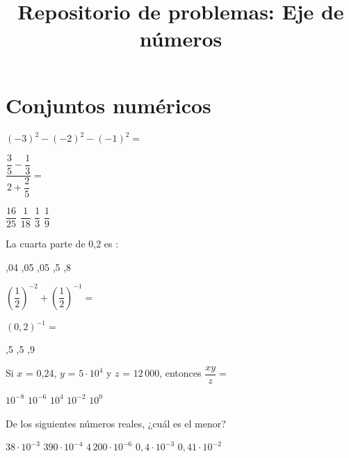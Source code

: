 \documentclass[pagina vacia]{srs}
\title{Repositorio de problemas: Eje de números}
\begin{document}
\maketitle
\section{Conjuntos numéricos}



\begin{preguntas}[after-item-skip=1cm]
\pregunta \( \left(-3\right)^2 - \left(-2\right)^2 - \left(-1\right)^2 = \)
\begin{vertical}
\end{vertical}

\pregunta \( \dfrac{\dfrac{3}{5} - \dfrac{1}{3}}{2 + \dfrac{2}{5}} = \)
\begin{vertical}
\alternativa \( \dfrac{16}{25} \)
\alternativa \( \dfrac{1}{18} \)
\alternativa \( \dfrac{1}{3} \)
\alternativa \( \dfrac{1}{9} \)
\end{vertical}

\pregunta La cuarta parte de 0,2 es :
\begin{vertical}
,04
,05
,05
,5
,8
\end{vertical}

\pregunta \( \left(\dfrac{1}{2}\right)^{-2} + \left(\dfrac{1}{2}\right)^{-1} = \)
\begin{vertical}
\end{vertical}

\pregunta \( (0,2)^{-1} = \)
\begin{vertical}
,5
,5
,9
\end{vertical}

\pregunta Si \(x\) = 0,24, \(y\) = \(5 \cdot 10^4\) y \(z\) = \(12\,000\), entonces
\( \dfrac{xy}{z} = \)
\begin{vertical}
\alternativa \( 10^{-8} \)
\alternativa \( 10^{-6} \)
\alternativa \( 10^{4} \)
\alternativa \( 10^{-2} \)
\alternativa \( 10^{0} \)
\end{vertical}

\pregunta De los siguientes números reales, ¿cuál es el menor?
\begin{vertical}
\alternativa \( 38 \cdot 10^{-3} \)
\alternativa \( 390 \cdot 10^{-4} \)
\alternativa \( 4\,200 \cdot 10^{-6} \)
\alternativa \( 0,4 \cdot 10^{-3} \)
\alternativa \( 0,41 \cdot 10^{-2} \)
\end{vertical}


\end{preguntas}
\end{document}
